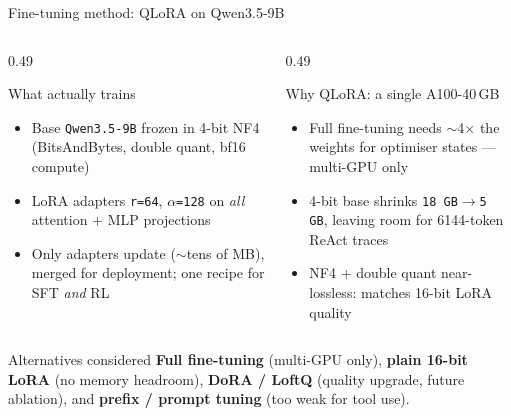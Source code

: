 \documentclass[aspectratio=169,t]{beamer}
\begin{document}
\begin{frame}{Fine-tuning method: QLoRA on Qwen3.5-9B}
  \begin{columns}[T,onlytextwidth]
    \begin{column}{0.49\textwidth}
      \begin{block}{What actually trains}
        \scriptsize
        \begin{itemize}\setlength\itemsep{0.2em}
          \item Base \texttt{Qwen3.5-9B} frozen in \alert{4-bit NF4}
                (BitsAndBytes, double quant, bf16 compute)
          \item LoRA adapters \texttt{r=64}, \texttt{$\alpha$=128} on
                \emph{all} attention + MLP projections
          \item Only adapters update ($\sim$tens of MB), merged for
                deployment; one recipe for SFT \emph{and} RL
        \end{itemize}
      \end{block}
    \end{column}%
    \hfill
    \begin{column}{0.49\textwidth}
      \begin{exampleblock}{Why QLoRA: a single A100-40\,GB}
        \scriptsize
        \begin{itemize}\setlength\itemsep{0.2em}
          \item Full fine-tuning needs $\sim$4$\times$ the weights for
                optimiser states --- multi-GPU only
          \item 4-bit base shrinks \texttt{18\,GB$\rightarrow$5\,GB},
                leaving room for 6144-token ReAct traces
          \item NF4 + double quant near-lossless: matches 16-bit LoRA
                quality~\cite{dettmers2023qlora}
        \end{itemize}
      \end{exampleblock}
    \end{column}
  \end{columns}

  \begin{alertblock}{Alternatives considered}
    \scriptsize
    \textbf{Full fine-tuning} (multi-GPU only),
    \textbf{plain 16-bit LoRA} (no memory headroom),
    \textbf{DoRA / LoftQ} (quality upgrade, future ablation), and
    \textbf{prefix / prompt tuning} (too weak for tool use).
  \end{alertblock}
\end{frame}
\end{document}
